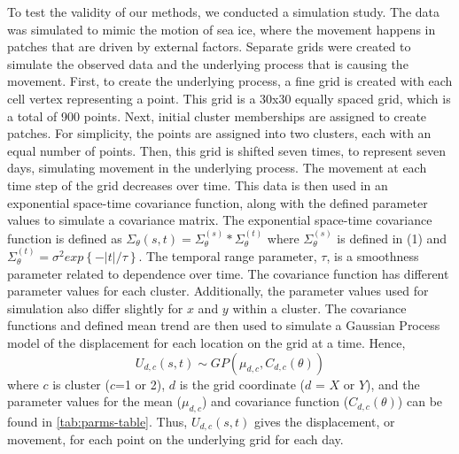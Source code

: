 \documentclass[12pt]{article}
\begin{document}
To test the validity of our methods, we conducted a simulation study.
The data was simulated to mimic the motion of sea ice, where the
movement happens in patches that are driven by external factors.
Separate grids were created to simulate the observed data and the
underlying process that is causing the movement. First, to create the
underlying process, a fine grid is created with each cell vertex
representing a point. This grid is a 30x30 equally spaced grid, which is
a total of 900 points. Next, initial cluster memberships are assigned to
create patches. For simplicity, the points are assigned into two
clusters, each with an equal number of points. Then, this grid is
shifted seven times, to represent seven days, simulating movement in the
underlying process. The movement at each time step of the grid decreases
over time. This data is then used in an exponential space-time
covariance function, along with the defined parameter values to simulate
a covariance matrix. The exponential space-time covariance function is
defined as
\(\Sigma_{\theta}(s,t) = \Sigma_{\theta}^{(s)} * \Sigma_{\theta}^{(t)}\)
where \(\Sigma_{\theta}^{(s)}\) is defined in (1) and
\(\Sigma_{\theta}^{(t)} = \sigma^2 exp\left\{-|t|/\tau\right\}\). The
temporal range parameter, \(\tau\), is a smoothness parameter related to
dependence over time. The covariance function has different parameter
values for each cluster. Additionally, the parameter values used for
simulation also differ slightly for \(x\) and \(y\) within a cluster.
The covariance functions and defined mean trend are then used to
simulate a Gaussian Process model of the displacement for each location
on the grid at a time. Hence,
\[ U_{d,c}(s,t) \sim GP(\mu_{d,c}, C_{d,c}(\theta))\] where \(c\) is
cluster (\(c\)=1 or 2), \(d\) is the grid coordinate (\(d\) = \(X\) or
\(Y\)), and the parameter values for the mean (\(\mu_{d,c}\)) and
covariance function (\(C_{d,c}(\theta)\)) can be found in
\cref{tab:parms-table}. Thus, \(U_{d,c}(s,t)\) gives the displacement,
or movement, for each point on the underlying grid for each day.
\end{document}
